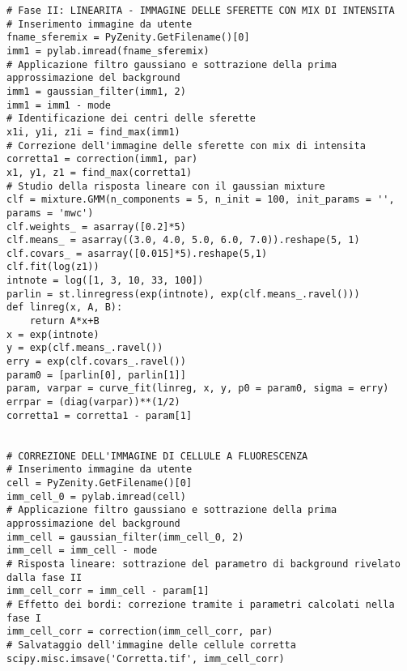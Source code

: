\begin{lstlisting}
# Fase II: LINEARITA - IMMAGINE DELLE SFERETTE CON MIX DI INTENSITA
# Inserimento immagine da utente
fname_sferemix = PyZenity.GetFilename()[0]
imm1 = pylab.imread(fname_sferemix)
# Applicazione filtro gaussiano e sottrazione della prima approssimazione del background
imm1 = gaussian_filter(imm1, 2)
imm1 = imm1 - mode
# Identificazione dei centri delle sferette
x1i, y1i, z1i = find_max(imm1)
# Correzione dell'immagine delle sferette con mix di intensita
corretta1 = correction(imm1, par)
x1, y1, z1 = find_max(corretta1)
# Studio della risposta lineare con il gaussian mixture
clf = mixture.GMM(n_components = 5, n_init = 100, init_params = '', params = 'mwc') 
clf.weights_ = asarray([0.2]*5)
clf.means_ = asarray((3.0, 4.0, 5.0, 6.0, 7.0)).reshape(5, 1)
clf.covars_ = asarray([0.015]*5).reshape(5,1)
clf.fit(log(z1))
intnote = log([1, 3, 10, 33, 100])
parlin = st.linregress(exp(intnote), exp(clf.means_.ravel()))
def linreg(x, A, B):
    return A*x+B
x = exp(intnote)
y = exp(clf.means_.ravel())
erry = exp(clf.covars_.ravel())
param0 = [parlin[0], parlin[1]]
param, varpar = curve_fit(linreg, x, y, p0 = param0, sigma = erry)
errpar = (diag(varpar))**(1/2)
corretta1 = corretta1 - param[1]


# CORREZIONE DELL'IMMAGINE DI CELLULE A FLUORESCENZA
# Inserimento immagine da utente
cell = PyZenity.GetFilename()[0]
imm_cell_0 = pylab.imread(cell)
# Applicazione filtro gaussiano e sottrazione della prima approssimazione del background
imm_cell = gaussian_filter(imm_cell_0, 2)
imm_cell = imm_cell - mode
# Risposta lineare: sottrazione del parametro di background rivelato dalla fase II
imm_cell_corr = imm_cell - param[1]
# Effetto dei bordi: correzione tramite i parametri calcolati nella fase I
imm_cell_corr = correction(imm_cell_corr, par)
# Salvataggio dell'immagine delle cellule corretta
scipy.misc.imsave('Corretta.tif', imm_cell_corr)
\end{lstlisting}